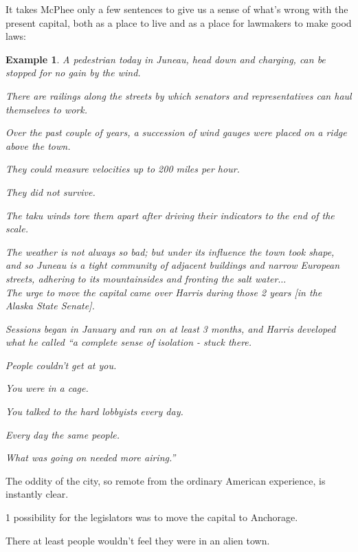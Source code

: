 \documentclass{book}
\numberwithin{equation}{section}
\newtheorem{example}{Example}[chapter]
\begin{document}
It takes McPhee only a few sentences to give us a sense of what's wrong with the present capital, both as a place to live and as a place for lawmakers to make good laws:
\begin{example}
    A pedestrian today in Juneau, head down and charging, can be stopped for no gain by the wind.
    
    There are railings along the streets by which senators and representatives can haul themselves to work.
    
    Over the past couple of years, a succession of wind gauges were placed on a ridge above the town.
    
    They could measure velocities up to 200 miles per hour.
    
    They did not survive.
    
    The taku winds tore them apart after driving their indicators to the end of the scale.
    
    The weather is not always so bad; but under its influence the town took shape, and so Juneau is a tight community of adjacent buildings and narrow European streets, adhering to its mountainsides and fronting the salt water$\ldots$
    \\
    
    The urge to move the capital came over Harris during those 2 years [in the Alaska State Senate].
    
    Sessions began in January and ran on at least 3 months, and Harris developed what he called ``a complete sense of isolation - stuck there.
    
    People couldn't get at you.
    
    You were in a cage.
    
    You talked to the hard lobbyists every day.
    
    Every day the same people.
    
    What was going on needed more airing.''
\end{example}
The oddity of the city, so remote from the ordinary American experience, is instantly clear.

1 possibility for the legislators was to move the capital to Anchorage.

There at least people wouldn't feel they were in an alien town.
\end{document}
